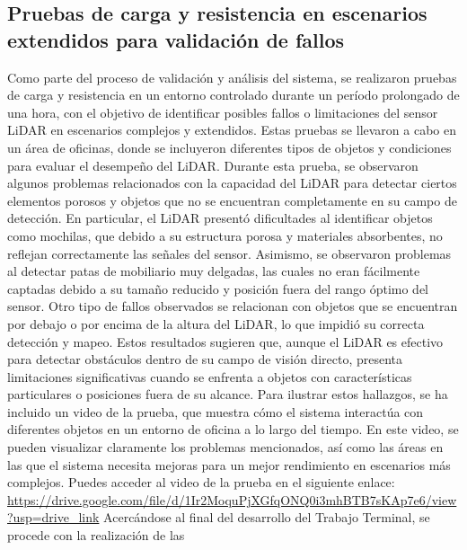 \subsection{Pruebas de carga y resistencia en escenarios extendidos para validaci\'on de fallos} %
    Como parte del proceso de validaci\'on y an\'alisis del sistema, se realizaron pruebas de carga y resistencia en un 
        entorno controlado durante un per\'iodo prolongado de una hora, con el objetivo de identificar posibles 
        fallos o limitaciones del sensor LiDAR en escenarios complejos y extendidos. Estas pruebas se llevaron 
        a cabo en un \'area de oficinas, donde se incluyeron diferentes tipos de objetos y condiciones para evaluar 
        el desempe\~no del LiDAR.
    \vskip 0.5cm
    Durante esta prueba, se observaron algunos problemas relacionados con la capacidad del LiDAR para detectar ciertos 
        elementos porosos y objetos que no se encuentran completamente en su campo de detecci\'on. En particular, el 
        LiDAR present\'o dificultades al identificar objetos como mochilas, que debido a su estructura porosa y 
        materiales absorbentes, no reflejan correctamente las se\~nales del sensor. Asimismo, se observaron 
        problemas al detectar patas de mobiliario muy delgadas, las cuales no eran f\'acilmente captadas 
        debido a su tama\~no reducido y posici\'on fuera del rango \'optimo del sensor.
    \vskip 0.5cm
    Otro tipo de fallos observados se relacionan con objetos que se encuentran por debajo o por encima de 
        la altura del LiDAR, lo que impidi\'o su correcta detecci\'on y mapeo. Estos resultados sugieren que, 
        aunque el LiDAR es efectivo para detectar obst\'aculos dentro de su campo de visi\'on directo, presenta 
        limitaciones significativas cuando se enfrenta a objetos con caracter\'isticas particulares o posiciones 
        fuera de su alcance.
    \vskip 0.5cm
    Para ilustrar estos hallazgos, se ha incluido un video de la prueba, que muestra c\'omo el sistema interact\'ua 
        con diferentes objetos en un entorno de oficina a lo largo del tiempo. En este video, se pueden visualizar 
        claramente los problemas mencionados, as\'i como las \'areas en las que el sistema necesita mejoras para un mejor 
        rendimiento en escenarios m\'as complejos.
    \vskip 0.5cm
    Puedes acceder al video de la prueba en el siguiente enlace: \url{https://drive.google.com/file/d/1Ir2MoquPjXGfqONQ0i3mhBTB7sKAp7e6/view?usp=drive_link}
    \vskip 0.5cm
    Acerc\'andose al final del desarrollo del Trabajo Terminal, se procede con la realizaci\'on de las
